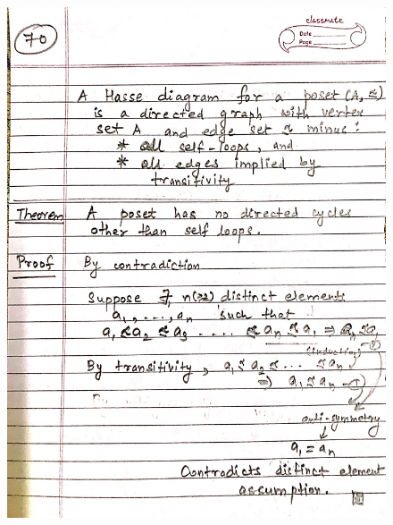 \begin{figure}[H]
    \centering
    \includegraphics[scale=0.25]{"./MIT-6.042J/MIT-6042J-070"}
\end{figure}
\newpage
